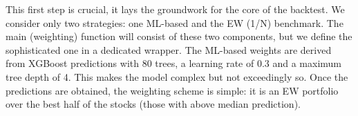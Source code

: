 \documentclass[]{krantz}
\makeatletter
\newenvironment{Shaded}{\begin{snugshade}}{\end{snugshade}}
\newcommand{\CommentTok}[1]{\textcolor[rgb]{0.37,0.37,0.37}{\textit{#1}}}
\newcommand{\DataTypeTok}[1]{\textcolor[rgb]{0.27,0.27,0.27}{#1}}
\newcommand{\DecValTok}[1]{\textcolor[rgb]{0.06,0.06,0.06}{#1}}
\newcommand{\KeywordTok}[1]{\textcolor[rgb]{0.27,0.27,0.27}{\textbf{#1}}}
\newcommand{\NormalTok}[1]{#1}
\newcommand{\OperatorTok}[1]{\textcolor[rgb]{0.43,0.43,0.43}{\textbf{#1}}}
\newcommand{\StringTok}[1]{\textcolor[rgb]{0.5,0.5,0.5}{#1}}
\newenvironment{kframe}{%
\medskip{}
\setlength{\fboxsep}{.8em}
 \def\at@end@of@kframe{}%
 \ifinner\ifhmode%
  \def\at@end@of@kframe{\end{minipage}}%
  \begin{minipage}{\columnwidth}%
 \fi\fi%
 \def\FrameCommand##1{\hskip\@totalleftmargin \hskip-\fboxsep
 \colorbox{shadecolor}{##1}\hskip-\fboxsep
     \hskip-\linewidth \hskip-\@totalleftmargin \hskip\columnwidth}%
 \MakeFramed {\advance\hsize-\width
   \@totalleftmargin\z@ \linewidth\hsize
   \@setminipage}}%
 {\par\unskip\endMakeFramed%
 \at@end@of@kframe}
\renewenvironment{Shaded}{\begin{kframe}}{\end{kframe}}
\theoremstyle{definition}
\theoremstyle{definition}
\theoremstyle{definition}
\theoremstyle{remark}
\makeatother
\begin{document}
\begin{Shaded}
\end{Shaded}

\normalsize

This first step is crucial, it lays the groundwork for the core of the
backtest. We consider only two strategies: one ML-based and the EW (1/N)
benchmark. The main (weighting) function will consist of these two
components, but we define the sophisticated one in a dedicated wrapper.
The ML-based weights are derived from XGBoost predictions with 80 trees,
a learning rate of 0.3 and a maximum tree depth of 4. This makes the
model complex but not exceedingly so. Once the predictions are obtained,
the weighting scheme is simple: it is an EW portfolio over the best half
of the stocks (those with above median prediction).
\end{document}
